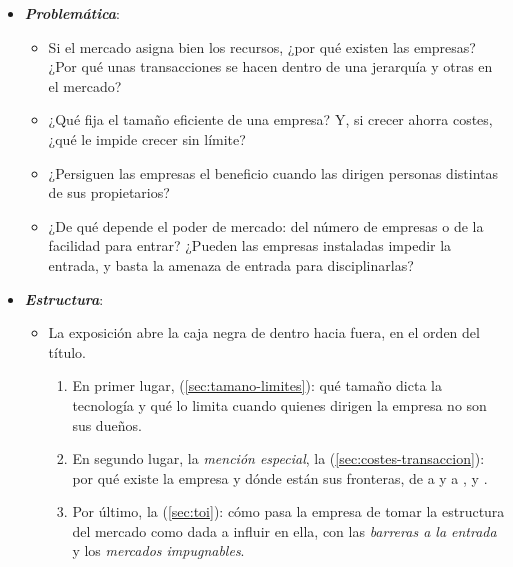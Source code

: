 \documentclass[11pt]{article}
\begin{document}
\begin{itemize}
\begin{itemize}
  \item La  (TOI) estudia el funcionamiento de los mercados en los que la competencia es imperfecta, la conducta de las empresas en ellos y sus efectos sobre el bienestar. En sentido amplio, incluye también la teoría de la empresa (por qué existe, dónde están sus fronteras, cómo se organiza por dentro)\nocite{Tirole1988Theory}; el título separa las 2~partes y la exposición las sigue en ese orden.\footnote{En Estados Unidos se dice \emph{industrial organization}; en Europa es frecuente \emph{economía industrial}. Sus fronteras son difusas: abarca desde la organización interna de las empresas hasta la estructura de los mercados y la política de competencia\nocite{Tirole1988Theory}.}
  \end{itemize}

\item \textbf{\emph{Problemática}}:
  \begin{itemize}
  \item Si el mercado asigna bien los recursos, ¿por qué existen las empresas? ¿Por qué unas transacciones se hacen dentro de una jerarquía y otras en el mercado?
  \item ¿Qué fija el tamaño eficiente de una empresa? Y, si crecer ahorra costes, ¿qué le impide crecer sin límite?
  \item ¿Persiguen las empresas el beneficio cuando las dirigen personas distintas de sus propietarios?
  \item ¿De qué depende el poder de mercado: del número de empresas o de la facilidad para entrar? ¿Pueden las empresas instaladas impedir la entrada, y basta la amenaza de entrada para disciplinarlas?
  \end{itemize}

\item \textbf{\emph{Estructura}}:
  \begin{itemize}
  \item La exposición abre la caja negra de dentro hacia fuera, en el orden del título.
  \begin{enumerate}
  \item En primer lugar,  (\ref{sec:tamano-limites}): qué tamaño dicta la tecnología y qué lo limita cuando quienes dirigen la empresa no son sus dueños.
  \item En segundo lugar, la \emph{mención especial}, la  (\ref{sec:costes-transaccion}): por qué existe la empresa y dónde están sus fronteras, de  a  y a ,  y .
  \item Por último, la  (\ref{sec:toi}): cómo pasa la empresa de tomar la estructura del mercado como dada a influir en ella, con las \emph{barreras a la entrada} y los \emph{mercados impugnables}.
  \end{enumerate}
  \end{itemize}
\end{itemize}
\end{document}
